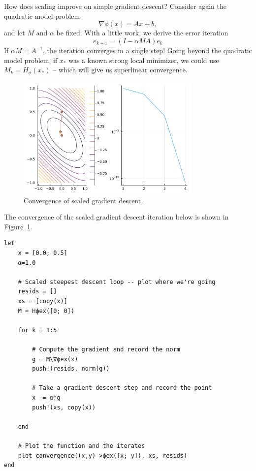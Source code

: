 \documentclass[12pt, leqno]{article} %
\begin{document}
How does scaling improve on simple gradient descent? Consider again the
quadratic model problem \[\nabla \phi(x) = Ax + b,\] and let \(M\) and
\(\alpha\) be fixed. With a little work, we derive the error iteration
\[e_{k+1} = (I-\alpha MA) e_k\] If \(\alpha M = A^{-1}\), the iteration
converges in a single step! Going beyond the quadratic model problem, if
\(x_*\) was a known strong local minimizer, we could use
\(M_k = H_{\phi}(x_*)\) -- which will give us superlinear convergence.

\begin{figure}
\begin{center}
  \includegraphics[width=0.8\textwidth]{fig/2023-03-31-gradient-scaled.pdf}
\end{center}
\caption{Convergence of scaled gradient descent.}
\label{fig:gradient-scaled}
\end{figure}

The convergence of the scaled gradient descent iteration below is
shown in Figure~\ref{fig:gradient-scaled}.

\begin{verbatim}
let
    x = [0.0; 0.5]
    α=1.0

    # Scaled steepest descent loop -- plot where we're going
    resids = []
    xs = [copy(x)]
    M = Hϕex([0; 0])

    for k = 1:5

        # Compute the gradient and record the norm
        g = M\∇ϕex(x)
        push!(resids, norm(g))

        # Take a gradient descent step and record the point
        x -= α*g
        push!(xs, copy(x))

    end

    # Plot the function and the iterates
    plot_convergence((x,y)->ϕex([x; y]), xs, resids)
end
\end{verbatim}
\end{document}
